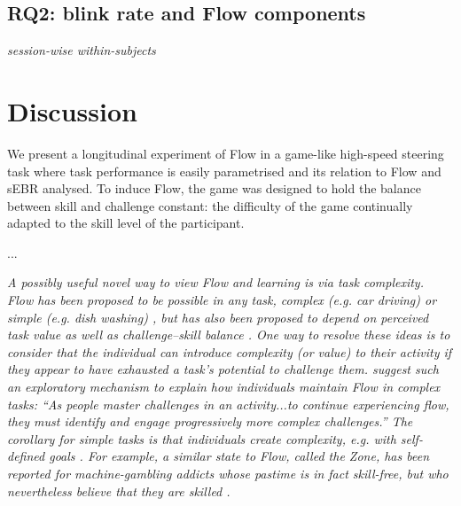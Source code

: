 \documentclass[10pt,letterpaper,floatsintext]{article}
\begin{document}
%

\subsection*{RQ2: blink rate and Flow components}
{\it session-wise within-subjects}



\section{Discussion}
We present a longitudinal experiment of Flow in a game-like high-speed steering task where task performance is easily parametrised and its relation to Flow and sEBR analysed. %
To induce Flow, the game was designed to hold the balance between skill and challenge constant: the difficulty of the game continually adapted to the skill level of the participant.

...

{\it A possibly useful novel way to view Flow and learning is via task complexity. Flow has been proposed to be possible in {\it any} task, complex (e.g. car driving) or simple (e.g. dish washing) \cite{Csikszentmihalyi1999}, but has also been proposed to depend on perceived task value as well as challenge--skill balance \cite{Keller2012}. One way to resolve these ideas is to consider that the individual can {\it introduce} complexity (or value) to their activity if they appear to have exhausted a task's potential to challenge them. \cite{Nakamura2002} suggest such an exploratory mechanism to explain how individuals maintain Flow in complex tasks: ``As people master challenges in an activity...to continue experiencing flow, they must identify and engage progressively more complex challenges.'' The corollary for simple tasks is that individuals {\it create} complexity, e.g. with self-defined goals \cite{Rauterberg1995}. For example, a similar state to Flow, called the Zone, has been reported for machine-gambling addicts whose pastime is in fact skill-free, but who nevertheless believe that they are skilled \cite{Schull2014}.}
\end{document}
